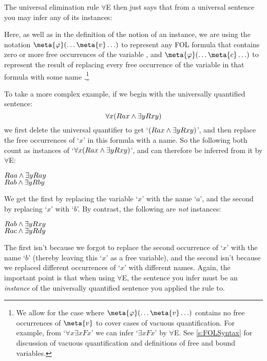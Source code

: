 The universal elimination rule $\forall$E then just says that from a universal sentence you may infer any of its instances:

Here, as well as in the definition of the notion of an instance, we are using the notation $\meta{\varphi}(\ldots \meta{v} \ldots)$ to represent any FOL formula \meta{\varphi} that contains zero or more free occurrences of the variable , and $\meta{\varphi}(\ldots \meta{c} \ldots)$ to represent the result of replacing every free occurrence of the variable  in that formula with some name .\footnote{We allow for the case where $\meta{\varphi}(\ldots \meta{v} \ldots)$ contains no free occurrences of $\meta{v}$ to cover cases of vacuous quantification.  For example, from `$\forall x\exists xFx$' we can infer `$\exists xFx$'  by $\forall$E.  See \ref{s:FOLSyntax} for discussion of vacuous quantification and definitions of free and bound variables.}

To take a more complex example, if we begin with the universally quantified sentence:
$$\forall x(Rax \wedge \exists yRxy)$$
we first delete the universal quantifier to get `$(Rax \wedge \exists yRxy)$', and then replace the free occurrences of `$x$' in this formula with a name.  So the following both count as instances of `$\forall x(Rax \wedge \exists yRxy)$', and can therefore be inferred from it by $\forall$E:
\begin{center}
$Raa \wedge \exists yRay$\\
$Rab \wedge \exists yRby$
\end{center}
We get the first by replacing the variable `$x$' with the name `$a$', and the second by replacing `$x$' with `$b$'. By contrast, the following are \emph{not} instances:
\begin{center}
$Rab \wedge \exists yRxy$\\
$Rac \wedge \exists yRdy$
\end{center}
The first isn't because we forgot to replace the second occurrence of `$x$' with the name `$b$' (thereby leaving this `$x$' as a free variable), and the second isn't because we replaced different occurrences of `$x$' with different names.  Again, the important point is that when using $\forall$E, the sentence you infer must be an \emph{instance} of the universally quantified sentence you applied the rule to.



